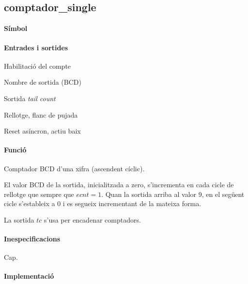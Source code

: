 \subsection{\label{sub:\projectname-comptador_single} \textsf{comptador\_single}}

\paragraph{Símbol}

\begin{center}  \end{center}

\paragraph{Entrades i sortides}

\begin{where}
\item[\nodenamebit{ecnt}] Habilitació del compte
\item[\nodenamerange{numx}{3}{0}] Nombre de sortida (BCD)
\item[\nodenamebit{tc}] Sortida \emph{tail count}
\item[\nodenamebit{clk}] Rellotge, flanc de pujada
\item[\nodenamebit{nrst}] Reset asíncron, actiu baix
\end{where}

\paragraph{Funció}

Comptador BCD d'una xifra (ascendent cíclic).

El valor BCD de la sortida, inicialitzada a zero, s'incrementa en cada cicle de rellotge que sempre que $ecnt = 1$.
Quan la sortida arriba al valor 9, en el següent cicle s'estableix a 0 i es segueix incrementant de la mateixa forma.

La sortida $tc$ s'usa per encadenar comptadors.

\paragraph{Inespecificacions}

Cap.

\paragraph{Implementació}

